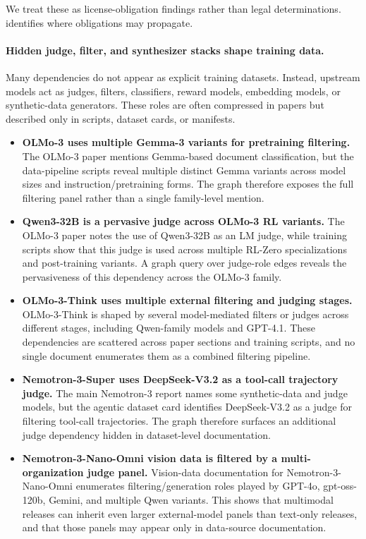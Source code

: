 We treat these as license-obligation findings rather than legal determinations. \system{} identifies where obligations may propagate.

\paragraph{Hidden judge, filter, and synthesizer stacks shape training data.}

Many dependencies do not appear as explicit training datasets. Instead, upstream models act as judges, filters, classifiers, reward models, embedding models, or synthetic-data generators. These roles are often compressed in papers but described only in scripts, dataset cards, or manifests.

\begin{itemize}
    \item \textbf{OLMo-3 uses multiple Gemma-3 variants for pretraining filtering.}
    The OLMo-3 paper mentions Gemma-based document classification, but the data-pipeline scripts reveal multiple distinct Gemma variants across model sizes and instruction/pretraining forms. The graph therefore exposes the full filtering panel rather than a single family-level mention.

    \item \textbf{Qwen3-32B is a pervasive judge across OLMo-3 RL variants.}
    The OLMo-3 paper notes the use of Qwen3-32B as an LM judge, while training scripts show that this judge is used across multiple RL-Zero specializations and post-training variants. A graph query over judge-role edges reveals the pervasiveness of this dependency across the OLMo-3 family.

    \item \textbf{OLMo-3-Think uses multiple external filtering and judging stages.}
    OLMo-3-Think is shaped by several model-mediated filters or judges across different stages, including Qwen-family models and GPT-4.1. These dependencies are scattered across paper sections and training scripts, and no single document enumerates them as a combined filtering pipeline.

    \item \textbf{Nemotron-3-Super uses DeepSeek-V3.2 as a tool-call trajectory judge.}
    The main Nemotron-3 report names some synthetic-data and judge models, but the agentic dataset card identifies DeepSeek-V3.2 as a judge for filtering tool-call trajectories. The graph therefore surfaces an additional judge dependency hidden in dataset-level documentation.

    \item \textbf{Nemotron-3-Nano-Omni vision data is filtered by a multi-organization judge panel.}
    Vision-data documentation for Nemotron-3-Nano-Omni enumerates filtering/generation roles played by GPT-4o, gpt-oss-120b, Gemini, and multiple Qwen variants. This shows that multimodal releases can inherit even larger external-model panels than text-only releases, and that those panels may appear only in data-source documentation.
\end{itemize}

